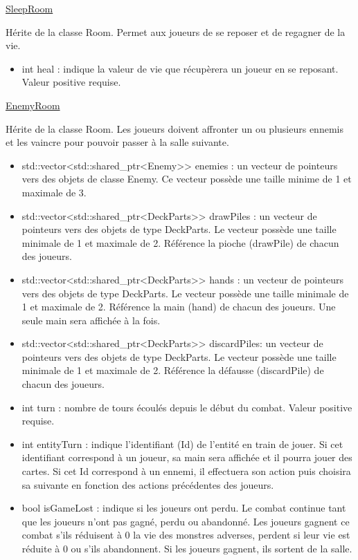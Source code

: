 \underline{SleepRoom}
\par Hérite de la classe Room. Permet aux joueurs de se reposer et de regagner de la vie.
\begin{itemize}
    \item int heal : indique la valeur de vie que récupèrera un joueur en se reposant. Valeur positive requise.
\end{itemize}

\underline{EnemyRoom}
\par Hérite de la classe Room. Les joueurs doivent affronter un ou plusieurs ennemis et les vaincre pour pouvoir passer à la salle suivante.
\begin{itemize}
    \item std::vector<std::shared\_ptr<Enemy>> enemies : un vecteur de pointeurs vers des objets de classe Enemy. Ce vecteur possède une taille minime de 1 et maximale de 3.
    \item std::vector<std::shared\_ptr<DeckParts>> drawPiles : un vecteur de pointeurs vers des objets de type DeckParts. Le vecteur possède une taille minimale de 1 et maximale de 2. Référence la pioche (drawPile) de chacun des joueurs.
    \item std::vector<std::shared\_ptr<DeckParts>> hands : un vecteur de pointeurs vers des objets de type DeckParts. Le vecteur possède une taille minimale de 1 et maximale de 2. Référence la main (hand) de chacun des joueurs. Une seule main sera affichée à la fois.
    \item std::vector<std::shared\_ptr<DeckParts>> discardPiles: un vecteur de pointeurs vers des objets de type DeckParts. Le vecteur possède une taille minimale de 1 et maximale de 2. Référence la défausse (discardPile) de chacun des joueurs.
    \item int turn : nombre de tours écoulés depuis le début du combat. Valeur positive requise. 
    \item int entityTurn : indique l'identifiant (Id) de l'entité en train de jouer. Si cet identifiant correspond à un joueur, sa main sera affichée et il pourra jouer des cartes. Si cet Id correspond à un ennemi, il effectuera son action puis choisira sa suivante en fonction des actions précédentes des joueurs.
    \item bool isGameLost : indique si les joueurs ont perdu. Le combat continue tant que les joueurs n'ont pas gagné, perdu ou abandonné. Les joueurs gagnent ce combat s'ils réduisent à 0 la vie des monstres adverses, perdent si leur vie est réduite à 0 ou s'ils abandonnent. Si les joueurs gagnent, ils sortent de la salle.
    
\end{itemize}


